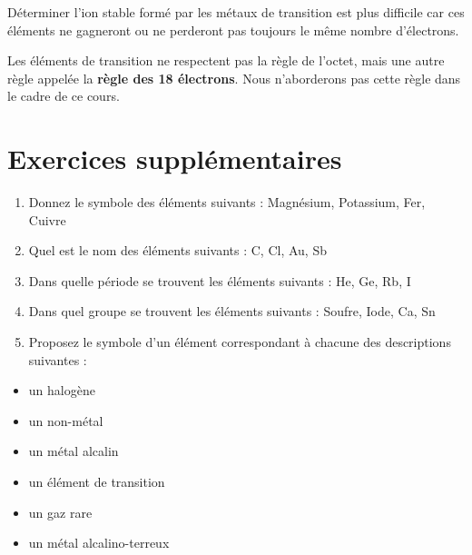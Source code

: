 \documentclass[
  11pt,
  a4paper,
  openany]{book}
\providecommand{\tightlist}{%
  \setlength{\itemsep}{0pt}\setlength{\parskip}{0pt}}
\begin{document}
Déterminer l'ion stable formé par les métaux de transition est plus difficile car ces éléments ne gagneront ou ne perderont pas toujours le même nombre d'électrons.

Les éléments de transition ne respectent pas la règle de l'octet, mais une autre règle appelée la \textbf{règle des 18 électrons}. Nous n'aborderons pas cette règle dans le cadre de ce cours.

\newpage

\section{Exercices supplémentaires}\label{exercices-suppluxe9mentaires-4}

\begin{Exercise}

\begin{enumerate}
\def\labelenumi{\arabic{enumi}.}
\tightlist
\item
  Donnez le symbole des éléments suivants :
  Magnésium, Potassium, Fer, Cuivre\\
\item
  Quel est le nom des éléments suivants :
  C, Cl, Au, Sb\\
\item
  Dans quelle période se trouvent les éléments suivants :
  He, Ge, Rb, I\\
\item
  Dans quel groupe se trouvent les éléments suivants :
  Soufre, Iode, Ca, Sn\\
\item
  Proposez le symbole d'un élément correspondant à chacune des descriptions suivantes :
\end{enumerate}

\begin{itemize}
\tightlist
\item
  un halogène
\item
  un non-métal
\item
  un métal alcalin
\item
  un élément de transition
\item
  un gaz rare
\item
  un métal alcalino-terreux
\end{itemize}

\end{Exercise}
\end{document}
